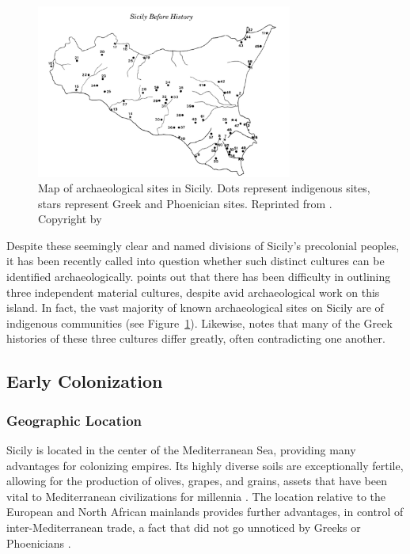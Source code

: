 \documentclass{../../../coursework}
\begin{document}
\begin{figure}
    \centering
    \includegraphics[width=0.75\textwidth]{sicily_fig_leighton.png}
    \caption{Map of archaeological sites in Sicily. Dots represent indigenous
    sites, stars represent Greek and Phoenician sites. Reprinted from
    . Copyright \citeyear{Lei99} by \citeauthor{Lei99}}
    \label{fig:Leighton}
\end{figure}

Despite these seemingly clear and named divisions of Sicily's precolonial
peoples, it has been recently called into question whether such distinct
cultures can be identified archaeologically. \textcite{Lei99} points out that
there has been difficulty in outlining three independent material cultures,
despite avid archaeological work on this island. In fact, the vast majority of
known archaeological sites on Sicily are of indigenous communities (see
Figure~\ref{fig:Leighton}). Likewise, \textcite{Bal12} notes that many of the
Greek histories of these three cultures differ greatly, often contradicting
one another.

\subsection{Early Colonization}

\subsubsection{Geographic Location}

Sicily is located in the center of the Mediterranean Sea, providing many
advantages for colonizing empires. Its highly diverse soils \parencite{Bal68}
are exceptionally fertile, allowing for the production of olives, grapes, and
grains, assets that have been vital to Mediterranean civilizations for
millennia \parencite{Bal12}. The location relative to the European and North
African mainlands provides further advantages, in control of
inter-Mediterranean trade, a fact that did not go unnoticed by Greeks or
Phoenicians \parencite{DeA03}.
\end{document}
